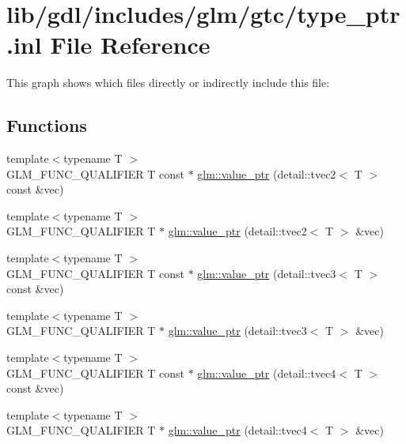 \hypertarget{type__ptr_8inl}{}\section{lib/gdl/includes/glm/gtc/type\+\_\+ptr.inl File Reference}
\label{type__ptr_8inl}
This graph shows which files directly or indirectly include this file\+:
\subsection*{Functions}
\begin{DoxyCompactItemize}
\item 
{\footnotesize template$<$typename T $>$ }\\G\+L\+M\+\_\+\+F\+U\+N\+C\+\_\+\+Q\+U\+A\+L\+I\+F\+I\+E\+R T const $\ast$ \hyperlink{group__gtc__type__ptr_ga57d829c43ef1f8bbe196343744392069}{glm\+::value\+\_\+ptr} (detail\+::tvec2$<$ T $>$ const \&vec)
\item 
{\footnotesize template$<$typename T $>$ }\\G\+L\+M\+\_\+\+F\+U\+N\+C\+\_\+\+Q\+U\+A\+L\+I\+F\+I\+E\+R T $\ast$ \hyperlink{group__gtc__type__ptr_ga70900f03d3f6eead08cbeb8eebe2a596}{glm\+::value\+\_\+ptr} (detail\+::tvec2$<$ T $>$ \&vec)
\item 
{\footnotesize template$<$typename T $>$ }\\G\+L\+M\+\_\+\+F\+U\+N\+C\+\_\+\+Q\+U\+A\+L\+I\+F\+I\+E\+R T const $\ast$ \hyperlink{group__gtc__type__ptr_ga10a568d24db822588013d8087b67eaad}{glm\+::value\+\_\+ptr} (detail\+::tvec3$<$ T $>$ const \&vec)
\item 
{\footnotesize template$<$typename T $>$ }\\G\+L\+M\+\_\+\+F\+U\+N\+C\+\_\+\+Q\+U\+A\+L\+I\+F\+I\+E\+R T $\ast$ \hyperlink{group__gtc__type__ptr_ga3dfe9e6a5ebc3beeaa3a8b35cf2ffe1d}{glm\+::value\+\_\+ptr} (detail\+::tvec3$<$ T $>$ \&vec)
\item 
{\footnotesize template$<$typename T $>$ }\\G\+L\+M\+\_\+\+F\+U\+N\+C\+\_\+\+Q\+U\+A\+L\+I\+F\+I\+E\+R T const $\ast$ \hyperlink{group__gtc__type__ptr_ga75dd1f5ad6d007990c1f2cf55fe63789}{glm\+::value\+\_\+ptr} (detail\+::tvec4$<$ T $>$ const \&vec)
\item 
{\footnotesize template$<$typename T $>$ }\\G\+L\+M\+\_\+\+F\+U\+N\+C\+\_\+\+Q\+U\+A\+L\+I\+F\+I\+E\+R T $\ast$ \hyperlink{group__gtc__type__ptr_ga63ee2093cab935f4471fdc55484aeb63}{glm\+::value\+\_\+ptr} (detail\+::tvec4$<$ T $>$ \&vec)

\end{DoxyCompactItemize}
